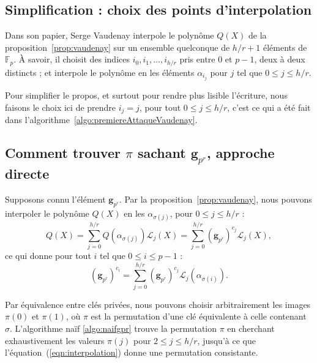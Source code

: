 \documentclass[a4paper, titlepage, 11pt]{article}
\theoremstyle{definition}
\theoremstyle{remark}
\def\gf #1{\mathbb{F}_{#1}}
\def\mbf #1{\mathbf{#1}}
\begin{document}
\subsection{Simplification : choix des points d'interpolation}

Dans son papier, Serge Vaudenay interpole le polynôme $Q(X)$ de la proposition~\ref{prop:vaudenay} sur un ensemble quelconque de $h/r+1$ éléments de $\gf{p}$. À savoir, il choisit des indices $i_0, i_1, \dots, i_{h/r}$ pris entre $0$ et $p-1$, deux à deux distincts ; et interpole le polynôme en les éléments $\alpha_{i_j}$ pour $j$ tel que $0 \leqslant j \leqslant h/r$.

Pour simplifier le propos, et surtout pour rendre plus lisible l'écriture, nous faisons le choix ici de prendre $i_j = j$, pour tout $0 \leqslant j \leqslant h/r$, c'est ce qui a été fait dans l'algorithme~\ref{algo:premiereAttaqueVaudenay}.

\subsection{Comment trouver $\pi$ sachant $\mbf g_{p^r}$, approche directe}

Supposons connu l'élément $\mbf g_{p^r}$. Par la proposition~\ref{prop:vaudenay}, nous pouvons interpoler le polynôme $Q(X)$ en les $\alpha_{\sigma(j)}$, pour $0 \leqslant j \leqslant h/r$ :
$$ Q(X) = \sum_{j=0}^{h/r} Q\left(\alpha_{\sigma(j)}\right) \mathcal L_j(X) = \sum_{j=0}^{h/r} (\mbf g_{p^r})^{c_{j}} \mathcal L_j(X),$$
ce qui donne pour tout $i$ tel que $0\leqslant i \leqslant p-1$ :
\begin{equation}\label{eqn:interpolation}
(\mbf g_{p^r})^{c_i} = \sum_{j=0}^{h/r} (\mbf g_{p^r})^{c_{j}} \mathcal L_j(\alpha_{\sigma(i)}).
\end{equation}

Par équivalence entre clés privées, nous pouvons choisir arbitrairement les images $\pi(0)$ et $\pi(1)$, où $\pi$ est la permutation d'une clé équivalente à celle contenant $\sigma$. L'algorithme naïf \ref{algo:naifgpr} trouve la permutation $\pi$ en cherchant exhaustivement les valeurs $\pi(j)$ pour $2\leqslant j \leqslant h/r$, jusqu'à ce que l'équation~(\ref{eqn:interpolation}) donne une permutation consistante.
\end{document}

